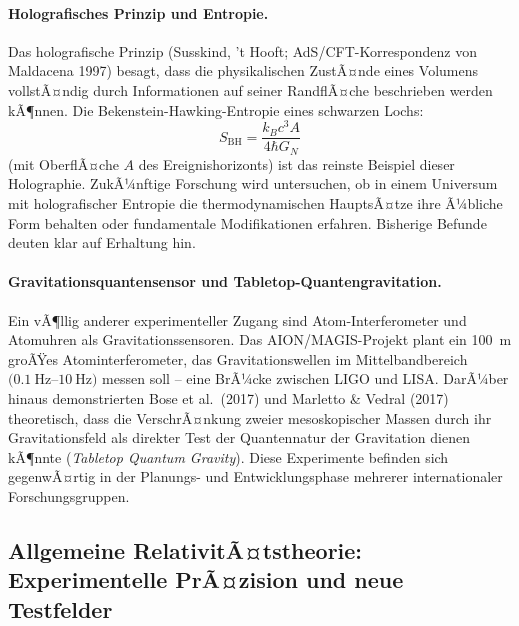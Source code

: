 ﻿\documentclass[12pt, a4paper]{report}
\theoremstyle{definition}
\theoremstyle{remark}
\begin{document}
\paragraph{Holografisches Prinzip und Entropie.}
Das holografische Prinzip (Susskind, 't Hooft; AdS/CFT-Korrespondenz von Maldacena
1997) besagt, dass die physikalischen ZustÃ¤nde eines Volumens vollstÃ¤ndig durch
Informationen auf seiner RandflÃ¤che beschrieben werden kÃ¶nnen. Die Bekenstein-Hawking-Entropie
eines schwarzen Lochs:
\begin{equation}
  S_{\text{BH}} = \frac{k_B c^3 A}{4 \hbar G_N}
  \label{eq:bhentropie}
\end{equation}
(mit OberflÃ¤che $A$ des Ereignishorizonts) ist das reinste Beispiel dieser
Holographie. ZukÃ¼nftige Forschung wird untersuchen, ob in einem Universum mit
holografischer Entropie die thermodynamischen HauptsÃ¤tze ihre Ã¼bliche Form
behalten oder fundamentale Modifikationen erfahren. Bisherige Befunde deuten
klar auf Erhaltung hin.

\paragraph{Gravitationsquantensensor und Tabletop-Quantengravitation.}
Ein vÃ¶llig anderer experimenteller Zugang sind Atom-Interferometer und
Atomuhren als Gravitationssensoren. Das AION/MAGIS-Projekt plant ein
\SI{100}{\metre} groÃŸes Atominterferometer, das Gravitationswellen im
Mittelbandbereich $(\SI{0.1}{\hertz}$--$\SI{10}{\hertz})$ messen soll -- eine
BrÃ¼cke zwischen LIGO und LISA. DarÃ¼ber hinaus demonstrierten Bose et al.\ (2017)
und Marletto \& Vedral (2017) theoretisch, dass die VerschrÃ¤nkung zweier
mesoskopischer Massen durch ihr Gravitationsfeld als direkter Test der
Quantennatur der Gravitation dienen kÃ¶nnte (\emph{Tabletop Quantum Gravity}).
Diese Experimente befinden sich gegenwÃ¤rtig in der Planungs- und
Entwicklungsphase mehrerer internationaler Forschungsgruppen.

\subsection{Allgemeine RelativitÃ¤tstheorie: Experimentelle PrÃ¤zision und
               neue Testfelder}
\end{document}
